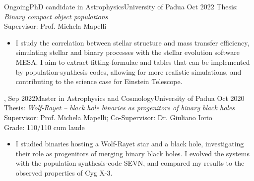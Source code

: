 %
%
%
\begin{experiences}
  \experiencetags
    {Ongoing}{PhD candidate in Astrophysics}{University of Padua}
    {Oct 2022}
    {Thesis: \textit{Binary compact object populations} \\
    Supervisor: Prof. Michela Mapelli  }{
    \begin{itemize}
        \item  I study the correlation between stellar structure and mass transfer efficiency, simulating stellar and binary processes with the stellar evolution software MESA. I aim to extract fitting-formulae and tables that can be implemented by population-synthesis codes, allowing for more realistic simulations, and contributing to the science case for Einstein Telescope.
    \end{itemize}
   }{,}
  \emptySeparator
  \experiencetags
    {Sep 2022}{Master in Astrophysics and Cosmology}{University of Padua}
    {Oct 2020} 
    {Thesis: \textit{Wolf-Rayet -- black hole binaries as progenitors of binary black holes} \\
    Supervisor: Prof. Michela Mapelli; Co-Supervisor: Dr. Giuliano Iorio \\
    Grade: 110/110 cum laude %
    }{
    \begin{itemize}
        \item I studied binaries hosting a Wolf-Rayet star and a black hole, investigating their role as progenitors of merging binary black holes. I evolved the systems with the population synthesis-code SEVN, and compared my results to the observed properties of Cyg X-3. 

\end{itemize}}
\end{experiences}
